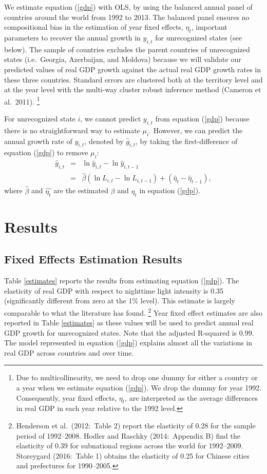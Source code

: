\documentclass[12pt,a4paper]{article}%
\begin{document}
We estimate equation (\ref{gdp}) with OLS, by using the balanced annual panel of countries around the world from 1992 to 2013. 
The balanced panel ensures no compositional bias in the estimation of year fixed effects, $\eta_t$, important parameters to recover the annual growth in $y_{i,t}$ for unrecognized states (see below). 
The sample of countries excludes the parent countries of unrecognized states (i.e.\ Georgia, Azerbaijan, and Moldova) because we will validate our predicted values of real GDP growth against the actual real GDP growth rates in these three countries.
Standard errors are clustered both at the territory level and at the year level with the multi-way cluster robust inference method (Cameron et al.\ 2011).%
\footnote{Due to multicollinearity, we need to drop one dummy for either a country or a year when we estimate equation (\ref{gdp}). We drop the dummy for year 1992. Consequently, year fixed effects, $\eta_{t}$, are interpreted as the average differences in real GDP in each year relative to the 1992 level.}

For unrecognized state $i$, we cannot predict $y_{i,t}$ from equation (\ref{gdp}) because there is no straightforward way to estimate $\mu_i$. However, we can predict the annual growth rate of $y_{i,t}$, denoted by $\hat{g}_{i,t}$, by taking the first-difference of equation (\ref{gdp}) to remove $\mu_i$:
\begin{eqnarray}\label{growth}
\hat{g}_{i,t} 
&=& \ln \hat{y}_{i,t} - \ln \hat{y}_{i, t-1} \nonumber \\
&=& \hat{\beta} (\ln L_{i,t} - \ln L_{i,t-1}) + (\hat{\eta}_t - \hat{\eta}_{t-1}),
\end{eqnarray}
where $\hat{\beta}$ and $\hat{\eta_t}$ are the estimated $\beta$ and $\eta_t$ in equation (\ref{gdp}).

\section{Results}\label{results}
\subsection{Fixed Effects Estimation Results}
Table \ref{estimates} reports the results from estimating equation (\ref{gdp}). 
The elasticity of real GDP with respect to nighttime light intensity is 0.35 (significantly different from zero at the 1\% level).
This estimate is largely comparable to what the literature has found.%
\footnote{
	Henderson et al.\ (2012:\ Table 2) report the elasticity of 0.28 for the sample period of 1992--2008. Hodler and Raschky (2014:\ Appendix B) find the elasticity of 0.39 for subnational regions across the world for 1992--2009. Storeygard (2016:\ Table 1) obtains the elasticity of 0.25 for Chinese cities and prefectures for 1990--2005. 
}   
Year fixed effect estimates are also reported in Table \ref{estimates} as these values will be used to predict annual real GDP growth for unrecognized states. 
Note that the adjusted R-squared is 0.99. 
The model represented in equation (\ref{gdp}) explains almost all the variations in real GDP across countries and over time. 
\end{document}
